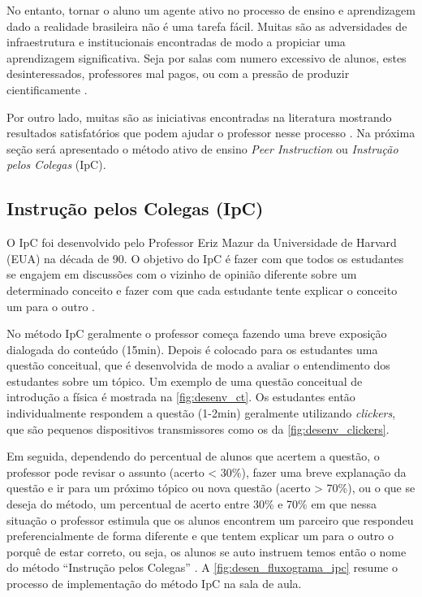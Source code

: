 No entanto, tornar o aluno um agente ativo no processo de ensino e aprendizagem dado a realidade brasileira
não é uma tarefa fácil. Muitas são as adversidades de infraestrutura e institucionais
encontradas de modo a propiciar uma aprendizagem significativa. Seja por salas com
numero excessivo de alunos, estes desinteressados, professores mal pagos, ou com
a pressão de produzir cientificamente \cite{Araujo2013}.

Por outro lado, muitas são as iniciativas encontradas na literatura mostrando resultados
satisfatórios que podem ajudar o professor nesse processo \cite{Crouch2001, Gok2013, Barros2004}.
Na próxima seção será apresentado o método ativo de ensino \textit{Peer Instruction} ou \textit{Instrução pelos Colegas}
(IpC).

\subsection{Instrução pelos Colegas (IpC)}
\label{section:ipc}

O IpC foi desenvolvido pelo Professor Eriz Mazur da Universidade de Harvard (EUA) na
década de 90. O objetivo do IpC é fazer com que todos os estudantes se engajem em
discussões com o vizinho de opinião diferente sobre um determinado conceito e fazer com que cada
estudante tente explicar o conceito um para o outro \cite{Mazur2009}.

No método IpC geralmente o professor começa fazendo uma breve exposição dialogada do conteúdo (15min).
Depois é colocado para os estudantes uma questão conceitual, que é
desenvolvida de modo a avaliar o entendimento dos estudantes sobre um tópico. Um
exemplo de uma questão conceitual de introdução a física é mostrada na \autoref{fig:desenv_ct}. Os
estudantes então individualmente respondem a questão (1-2min) geralmente utilizando
\textit{clickers}, que são pequenos dispositivos transmissores como os da \autoref{fig:desenv_clickers}.

Em seguida, dependendo do percentual de alunos que acertem a questão,
o professor pode revisar o assunto (acerto < 30\%), fazer uma breve explanação da
questão e ir para um próximo tópico ou nova questão (acerto > 70\%), ou o que se
deseja do método, um percentual de acerto entre 30\% e 70\% em que nessa situação o
professor estimula que os alunos encontrem um parceiro que respondeu preferencialmente de forma diferente
e que tentem explicar um para o outro o porquê de estar correto, ou seja, os alunos se auto
instruem temos então o nome do método ``Instrução pelos Colegas'' \cite{Mazur2009, Crouch2001}.
A \autoref{fig:desen_fluxograma_ipc} resume o processo de implementação do método IpC na sala de aula.

